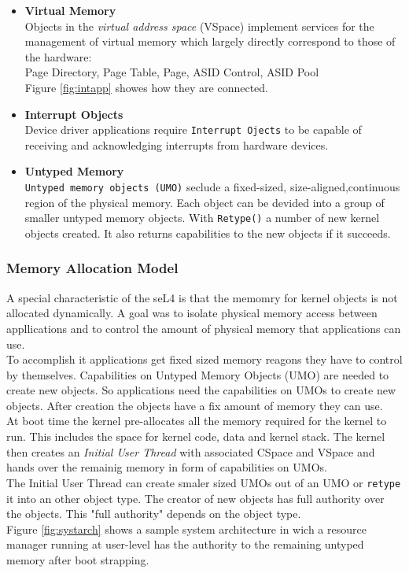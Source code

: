 \documentclass[pdftex,11pt,a4paper,twoside]{article}
\begin{document}
\begin{itemize}
	\item \textbf{Virtual Memory}\\
	Objects in the \textit{virtual address space} (VSpace) implement services for the management of virtual memory which largely directly correspond to those of the hardware: \\
	Page Directory, Page Table, Page, ASID Control, ASID Pool \\
	Figure \ref{fig:intapp} showes how they are connected.
	\item \textbf{Interrupt Objects} \\
	Device driver applications require \texttt{Interrupt Ojects} to be capable of receiving and acknowledging interrupts from hardware devices.
	\item \textbf{Untyped Memory} \\
	\texttt{Untyped memory objects (UMO)} seclude a fixed-sized, size-aligned,continuous region of the physical memory. Each object can be devided into a group of smaller untyped memory objects. With \texttt{Retype()} a number of new kernel objects created. It also returns capabilities to the new objects if it succeeds. 
	\end{itemize}

	\subsubsection{Memory Allocation Model} 
	A special characteristic of the seL4 is that the memomry for kernel objects is not allocated dynamically. A goal was to isolate physical memory access between appllications and to control the amount of physical memory that applications can use. \\
	To accomplish it applications get fixed sized memory reagons they have to control by themselves. 
	Capabilities on Untyped Memory Objects (UMO) are needed to create new objects. So applications need the capabilities on UMOs to create new objects. After creation the objects have a fix amount of memory they can use. \\
	At boot time the kernel pre-allocates all the memory required for the kernel to run. This includes the space for kernel code, data and kernel stack. The kernel then creates an \textit{Initial User Thread} with associated CSpace and VSpace and hands over the remainig memory in form of capabilities on UMOs. \\
	The Initial User Thread can create smaler sized UMOs out of an UMO or \texttt{retype} it into an other object type. The creator of new objects has full authority over the objects. This "full authority" depends on the object type. \\
	Figure \ref{fig:systarch} shows a sample system architecture in wich a resource manager running at user-level  has the authority to the remaining untyped memory after boot strapping. 
	
\end{document}
